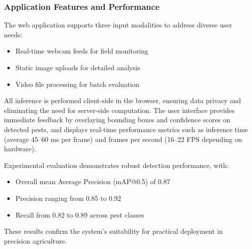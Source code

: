 \subsubsection{Application Features and Performance}
The web application supports three input modalities to address diverse user needs:
\begin{itemize}
    \item Real-time webcam feeds for field monitoring
    \item Static image uploads for detailed analysis
    \item Video file processing for batch evaluation
\end{itemize}
All inference is performed client-side in the browser, ensuring data privacy and eliminating the need for server-side computation. The user interface provides immediate feedback by overlaying bounding boxes and confidence scores on detected pests, and displays real-time performance metrics such as inference time (average 45--60 ms per frame) and frames per second (16--22 FPS depending on hardware).

Experimental evaluation demonstrates robust detection performance, with:
\begin{itemize}
    \item Overall mean Average Precision (mAP@0.5) of 0.87
    \item Precision ranging from 0.85 to 0.92
    \item Recall from 0.82 to 0.89 across pest classes
\end{itemize}
These results confirm the system’s suitability for practical deployment in precision agriculture.

